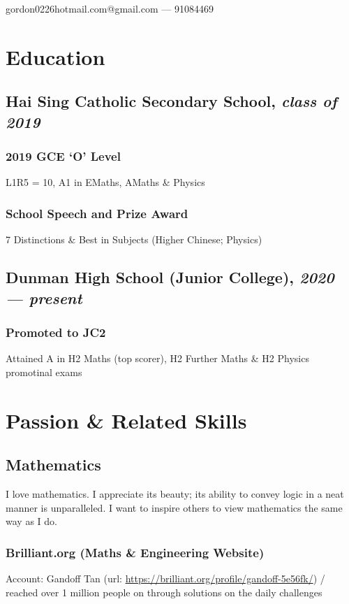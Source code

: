 \documentclass[a4paper]{article}
\makeatletter
\renewcommand{\maketitle}{
\begin{center}
{\huge\bf\theauthor}

\vspace{.25em}
gordon0226hotmail.com@gmail.com --- 91084469
\end{center}
}
\makeatother
\begin{document}
\author{Gordon Chan}
\maketitle

\section{Education}
\subsection{Hai Sing Catholic Secondary School, \emph{class of 2019}}
\subsubsection{2019 GCE `O' Level}
L1R5 = 10, A1 in EMaths, AMaths \& Physics
\subsubsection{School Speech and Prize Award}
7 Distinctions \& Best in Subjects (Higher Chinese; Physics)
\subsection{Dunman High School (Junior College), \emph{2020 --- present}}
\subsubsection{Promoted to JC2} 
Attained A in H2 Maths (top scorer), H2 Further Maths \& H2 Physics promotinal exams

\section{Passion \& Related Skills}
\subsection{Mathematics}
I love mathematics. I appreciate its beauty; its ability to convey logic in a neat manner is unparalleled. I want to inspire others to view mathematics the same way as I do.
\subsubsection{Brilliant.org (Maths \& Engineering Website)}
Account: Gandoff Tan (url: \url{https://brilliant.org/profile/gandoff-5e56fk/}) / reached over 1 million people on through solutions on the daily challenges
\end{document}

